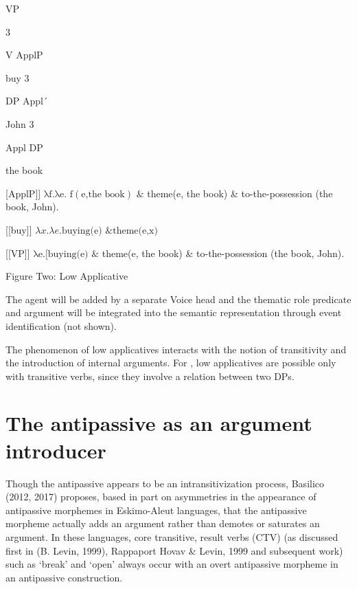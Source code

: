 \documentclass[output=paper,modfonts,nonflat]{langsci/langscibook}
\begin{document}
        VP

            3  

    V       ApplP

   buy   3

 DP      Appl´

John    3

Appl       DP

the book

[ApplP]]   $\text{λf.λe}\text{. f}\left(\text{e,the book}\right)\text{ \&} $ theme(e, the book) \& to-the-possession (the book, John).

[[buy]]   $\lambda \mathit{x.}\lambda \mathit{e.}\text{buying(e) \& theme(e,x)}$  

[[VP]]   $\text{λe}\text{.[}\text{buying(e) \&} $ theme(e, the book) \& to-the-possession (the book, John).

\begin{stylecaption}
Figure Two: Low Applicative
\end{stylecaption}

The agent will be added by a separate Voice head and the thematic role predicate and argument will be integrated into the semantic representation through event identification (not shown).

The phenomenon of low applicatives interacts with the notion of transitivity and the introduction of internal arguments.  For \citet{Pyllkänen2008}, low applicatives are possible only with transitive verbs, since they involve a relation between two DPs.

\section{The antipassive as an argument introducer} %

Though the antipassive appears to be an intransitivization process, Basilico (2012, 2017) proposes, based in part on asymmetries in the appearance of antipassive morphemes in Eskimo-Aleut languages, that the antipassive morpheme actually adds an argument rather than demotes or saturates an argument. In these languages, core transitive, result verbs (CTV) (as discussed first in (B. Levin, 1999), Rappaport Hovav \& Levin, 1999 and subsequent work) such as ‘break’ and ‘open’ always occur with an overt antipassive morpheme in an antipassive construction. 

\ea%
    \label{ex:key:3}
    \gll\\
        \\
    \glt
    \z
\end{document}
